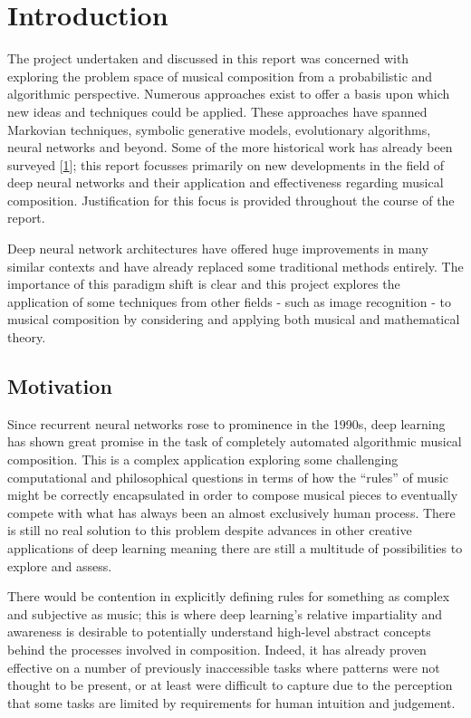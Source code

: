 \documentclass[12pt,]{article}
\begin{document}

\hypertarget{introduction}{%
\section{Introduction}\label{introduction}}

The project undertaken and discussed in this report was concerned with
exploring the problem space of musical composition from a probabilistic
and algorithmic perspective. Numerous approaches exist to offer a basis
upon which new ideas and techniques could be applied. These approaches
have spanned Markovian techniques, symbolic generative models,
evolutionary algorithms, neural networks and beyond. Some of the more
historical work has already been surveyed
{[}\protect\hyperlink{ref-nierhaus2009algorithmic}{1}{]}; this report
focusses primarily on new developments in the field of deep neural
networks and their application and effectiveness regarding musical
composition. Justification for this focus is provided throughout the
course of the report.

Deep neural network architectures have offered huge improvements in many
similar contexts and have already replaced some traditional methods
entirely. The importance of this paradigm shift is clear and this
project explores the application of some techniques from other fields -
such as image recognition - to musical composition by considering and
applying both musical and mathematical theory.

\hypertarget{motivation}{%
\subsection{Motivation}\label{motivation}}

Since recurrent neural networks rose to prominence in the 1990s, deep
learning has shown great promise in the task of completely automated
algorithmic musical composition. This is a complex application exploring
some challenging computational and philosophical questions in terms of
how the ``rules'' of music might be correctly encapsulated in order to
compose musical pieces to eventually compete with what has always been
an almost exclusively human process. There is still no real solution to
this problem despite advances in other creative applications of deep
learning meaning there are still a multitude of possibilities to explore
and assess.

There would be contention in explicitly defining rules for something as
complex and subjective as music; this is where deep learning's relative
impartiality and awareness is desirable to potentially understand
high-level abstract concepts behind the processes involved in
composition. Indeed, it has already proven effective on a number of
previously inaccessible tasks where patterns were not thought to be
present, or at least were difficult to capture due to the perception
that some tasks are limited by requirements for human intuition and
judgement.
\end{document}
